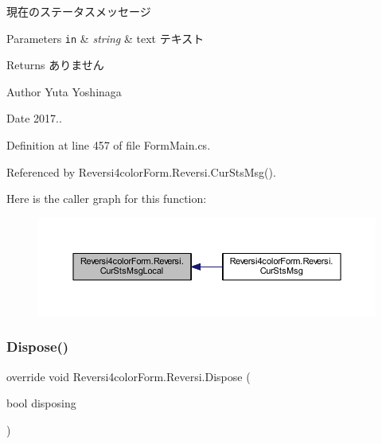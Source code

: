 現在のステータスメッセージ 


\begin{DoxyParams}[1]{Parameters}
\mbox{\tt in}  & {\em string} & text テキスト \\
\hline
\end{DoxyParams}
\begin{DoxyReturn}{Returns}
ありません 
\end{DoxyReturn}
\begin{DoxyAuthor}{Author}
Yuta Yoshinaga 
\end{DoxyAuthor}
\begin{DoxyDate}{Date}
2017.. 
\end{DoxyDate}


Definition at line 457 of file Form\+Main.\+cs.



Referenced by Reversi4color\+Form.\+Reversi.\+Cur\+Sts\+Msg().

Here is the caller graph for this function\+:
\nopagebreak
\begin{figure}[H]
\begin{center}
\leavevmode
\includegraphics[width=350pt]{class_reversi4color_form_1_1_reversi_a663e1d055e099d0855df8a34af31edf9_icgraph}
\end{center}
\end{figure}
\mbox{\label{class_reversi4color_form_1_1_reversi_aa6fa1c8eae6d12a2e4f310ef0acddbb1}} 
\subsubsection{\texorpdfstring{Dispose()}{Dispose()}}
{\footnotesize\ttfamily override void Reversi4color\+Form.\+Reversi.\+Dispose (\begin{DoxyParamCaption}\item[{bool}]{disposing }\end{DoxyParamCaption})\hspace{0.3cm}{\ttfamily [protected]}}



